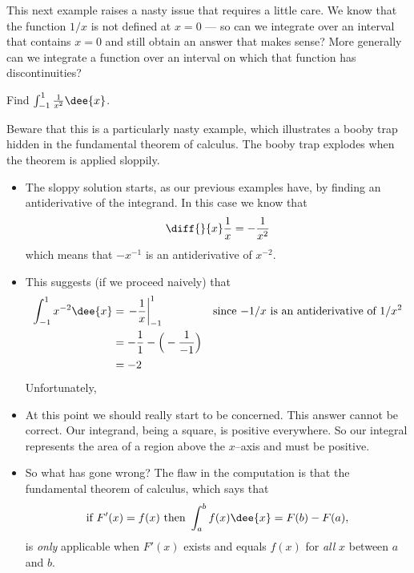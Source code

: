 This next example raises a nasty issue that requires a little care. We know that the
function $1/x$ is not defined at $x=0$ --- so can we integrate over an interval that
contains $x=0$ and still obtain an answer that makes sense? More generally can we
integrate a function over an interval on which that function has discontinuities?
\begin{eg}\label{eg:INTintegralE}
Find $\int_{-1}^1\frac{1}{x^2}\dee{x}$.

\soln Beware that this is a particularly nasty example, which illustrates
a booby trap hidden in the fundamental theorem of calculus. The booby trap
explodes when the theorem is applied sloppily.
\begin{itemize}
 \item The sloppy solution starts, as our previous examples have, by finding an
antiderivative of the integrand. In this case we know that
\begin{align*}
\diff{}{x}\frac{1}{x} = -\frac{1}{x^2}
\end{align*}
which means that $-x^{-1}$ is an antiderivative of $x^{-2}$.
\item This suggests (if we proceed naively) that
\begin{align*}
  \int_{-1}^1 x^{-2}\dee{x}
  &= \left.-\frac{1}{x}\right|_{-1}^1
  & \text{since $-1/x$ is an antiderivative of $1/x^2$}\\
  &= -\frac{1}{1}-\Big(-\frac{1}{-1}\Big)\\
  &=-2
\end{align*}
Unfortunately,

\item At this point we should really start to be concerned. This answer cannot be
correct.
Our integrand, being a square, is positive everywhere. So our integral represents the
area
of a region above the $x$--axis and must be positive.

\item So what has gone wrong? The flaw in the computation is that the fundamental theorem
of calculus, which says that
\begin{align*}
\text{if } F'(x)=f(x) \text{ then } \int_a^b f(x)\dee{x}=F(b)-F(a),
\end{align*}
is \emph{only} applicable when $F'(x)$ exists and equals $f(x)$ for \emph{all}
$x$ between $a$ and $b$.


\end{itemize}
\end{eg}
